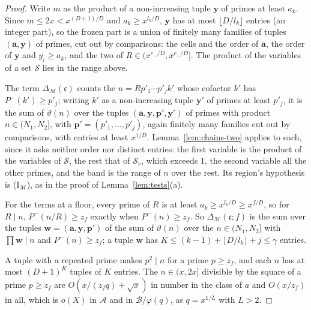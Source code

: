 \documentclass[11pt]{article}
\theoremstyle{definition}
\begin{document}
\begin{proof}
Write $m$ as the product of a non-increasing tuple $\mathbf y$ of primes at least $a_k$. Since $m \le 2x <
x^{(D + 1)/D}$ and $a_k \ge x^{l_k/D}$, $\mathbf y$ has at most $\lfloor D/l_k \rfloor$ entries (an integer part), so
the frozen part is a
union of finitely many families of tuples $(\mathbf a, \mathbf y)$ of primes, cut out by comparisons: the cells and the
order of $\mathbf a$, the order of $\mathbf y$ and $y_i \ge a_k$, and the two of $R \in (x^{e_-/D}, x^{e_+/D}]$. The
product of the variables of a set $\mathcal S$ lies in the range above.

The term $\Delta_{\mathcal M}(\mathfrak c)$ counts the $n = R p'_1 \cdots p'_j k'$ whose cofactor $k'$ has $P^-(k') \ge
p'_j$; writing $k'$ as a non-increasing tuple $\mathbf y'$ of primes at least $p'_j$, it is the sum of $\vartheta(n)$
over the tuples
$(\mathbf a, \mathbf y, \mathbf p', \mathbf y')$ of primes with product $n \in (N_1, N_2]$, with $\mathbf p' = (p'_1,
\dots, p'_j)$, again finitely many families cut out by
comparisons, with entries at least $x^{1/D}$. Lemma~\ref{lem:chains-two} applies to each, since it asks neither order
nor distinct entries: the first variable is the product of the variables of $\mathcal S$, the rest that of $\mathcal
S_r$, which exceeds $1$, the second variable all the other primes, and the band is the range of $n$ over the rest. Its
region's hypothesis is (I$_{\mathcal M}$), as in the proof of Lemma~\ref{lem:tests}(a).

For the terms at a floor, every prime of $R$ is at least $a_k \ge x^{l_k/D} \ge x^{f/D}$, so for $R \mid n$, $P^-(n/R)
\ge
z_f$ exactly when $P^-(n) \ge z_f$. So $\Delta_{\mathcal M}(\mathfrak c; f)$ is the sum over the tuples $\mathbf w =
(\mathbf a, \mathbf y, \mathbf p')$ of the sum of $\vartheta(n)$ over the $n \in (N_1, N_2]$ with $\prod \mathbf w \mid
n$
and $P^-(n) \ge z_f$; a tuple $\mathbf w$ has $K \le (k - 1) + \lfloor D/l_k \rfloor + j \le \gamma$ entries.

A tuple with a repeated prime makes $p^2 \mid n$ for a prime $p \ge z_f$, and each $n$ has at most $(D + 1)^K$ tuples
of $K$ entries. The $n \in (x, 2x]$ divisible by the square of a prime $p \ge z_f$ are $O(x/(z_f q) + \sqrt x)$ in
number in the class of $a$ and $O(x/z_f)$ in all, which is $o(X)$ in $\mathcal A$ and in $\mathcal B/\varphi(q)$, as
$q = x^{1/L}$ with $L > 2$.


\end{proof}
\end{document}
